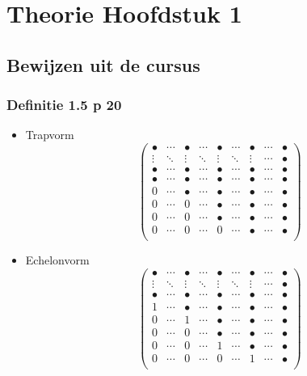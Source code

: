 \documentclass[lineaire_algebra_oplossingen.tex]{subfiles}
\begin{document}
\chapter{Theorie Hoofdstuk 1}
\section{Bewijzen uit de cursus}

\subsection{Definitie 1.5 p 20}
\label{1.5}
\begin{itemize}
\item Trapvorm
\[
\begin{pmatrix}
\bullet & \cdots & \bullet & \cdots & \bullet & \cdots & \bullet & \cdots & \bullet\\
\vdots & \ddots & \vdots & \ddots & \vdots & \ddots & \vdots & \cdots & \bullet\\
\bullet & \cdots & \bullet & \cdots & \bullet & \cdots & \bullet & \cdots & \bullet\\
\bullet & \cdots & \bullet & \cdots & \bullet & \cdots & \bullet & \cdots & \bullet\\
0 & \cdots & \bullet & \cdots & \bullet & \cdots & \bullet & \cdots & \bullet\\
0 & \cdots & 0 & \cdots & \bullet & \cdots & \bullet & \cdots & \bullet\\
0 & \cdots & 0 & \cdots & \bullet & \cdots & \bullet & \cdots & \bullet\\
0 & \cdots & 0 & \cdots & 0 & \cdots & \bullet & \cdots & \bullet\\
\end{pmatrix}
\]

\item Echelonvorm
\[
\begin{pmatrix}
\bullet & \cdots & \bullet & \cdots & \bullet & \cdots & \bullet & \cdots & \bullet\\
\vdots & \ddots & \vdots & \ddots & \vdots & \ddots & \vdots & \cdots & \bullet\\
\bullet & \cdots & \bullet & \cdots & \bullet & \cdots & \bullet & \cdots & \bullet\\
1 & \cdots & \bullet & \cdots & \bullet & \cdots & \bullet & \cdots & \bullet\\
0 & \cdots & 1 & \cdots & \bullet & \cdots & \bullet & \cdots & \bullet\\
0 & \cdots & 0 & \cdots & \bullet & \cdots & \bullet & \cdots & \bullet\\
0 & \cdots & 0 & \cdots & 1 & \cdots & \bullet & \cdots & \bullet\\
0 & \cdots & 0 & \cdots & 0 & \cdots & 1 & \cdots & \bullet\\
\end{pmatrix}
\]


\end{itemize}
\end{document}

